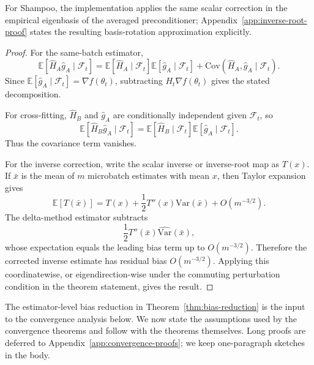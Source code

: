 \documentclass{article}
\newcommand{\E}{\mathbb{E}}
\newcommand{\Var}{\mathrm{Var}}
\begin{document}
For Shampoo, the implementation applies the same scalar correction in the empirical eigenbasis of the averaged preconditioner; Appendix~\ref{app:inverse-root-proof} states the resulting basis-rotation approximation explicitly.

\begin{proof}
For the same-batch estimator,
\begin{equation}
    \E[\widehat H_A\hat g_A\mid\mathcal F_t]
    =
    \E[\widehat H_A\mid\mathcal F_t]\E[\hat g_A\mid\mathcal F_t]
    +
    \mathrm{Cov}(\widehat H_A,\hat g_A\mid\mathcal F_t).
\end{equation}
Since $\E[\hat g_A\mid\mathcal F_t]=\nabla f(\theta_t)$, subtracting
$H_t\nabla f(\theta_t)$ gives the stated decomposition.

For cross-fitting, $\widehat H_B$ and $\hat g_A$ are conditionally independent given $\mathcal F_t$, so
\begin{equation}
    \E[\widehat H_B\hat g_A\mid\mathcal F_t]
    =
    \E[\widehat H_B\mid\mathcal F_t]
    \E[\hat g_A\mid\mathcal F_t].
\end{equation}
Thus the covariance term vanishes.

For the inverse correction, write the scalar inverse or inverse-root map as $T(x)$. If $\bar x$ is the mean of $m$ microbatch estimates with mean $x$, then Taylor expansion gives
\begin{equation}
    \E[T(\bar x)]
    =
    T(x)
    +
    \frac{1}{2}T''(x)\Var(\bar x)
    +
    O(m^{-3/2}).
\end{equation}
The delta-method estimator subtracts
\begin{equation}
    \frac{1}{2}T''(\bar x)\widehat{\Var}(\bar x),
\end{equation}
whose expectation equals the leading bias term up to $O(m^{-3/2})$. Therefore the corrected inverse estimate has residual bias $O(m^{-3/2})$. Applying this coordinatewise, or eigendirection-wise under the commuting perturbation condition in the theorem statement, gives the result.
\end{proof}

The estimator-level bias reduction in Theorem~\ref{thm:bias-reduction} is the input to the convergence analysis below. We now state the assumptions used by the convergence theorems and follow with the theorems themselves. Long proofs are deferred to Appendix~\ref{app:convergence-proofs}; we keep one-paragraph sketches in the body.
\end{document}
